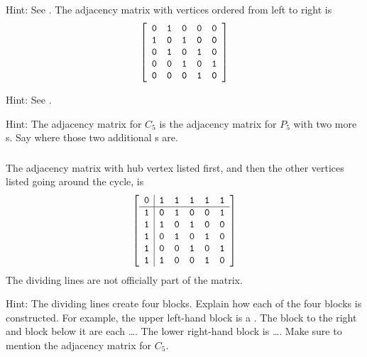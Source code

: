 \subsubsection*{ \answers}
\begin{apart}
    \item Hint: See .  The adjacency matrix with vertices ordered from left to right is
        $$\left[ 
            \begin{array}{ccccc}
                \texttt{0} & \texttt{1} & \texttt{0} & \texttt{0} & \texttt{0} \\
                \texttt{1} & \texttt{0} & \texttt{1} & \texttt{0} & \texttt{0} \\
                \texttt{0} & \texttt{1} & \texttt{0} & \texttt{1} & \texttt{0} \\
                \texttt{0} & \texttt{0} & \texttt{1} & \texttt{0} & \texttt{1} \\
                \texttt{0} & \texttt{0} & \texttt{0} & \texttt{1} & \texttt{0}               
            \end{array}
            \right]$$
    \item Hint: See .  
    \item Hint: The adjacency matrix for $C_5$ is the adjacency matrix for $P_5$ with two more s. Say where those two additional s are.
\end{apart}

\subsubsection*{ \answers}
\begin{apart}
    \item The adjacency matrix with hub vertex listed first, and then the other vertices listed going around the cycle, is
        $$\left[ 
            \begin{array}{c|ccccc}
                \texttt{0} &\texttt{1} & \texttt{1} & \texttt{1} & \texttt{1} & \texttt{1} \\ \hline
                \texttt{1} &\texttt{0} & \texttt{1} & \texttt{0} & \texttt{0} & \texttt{1} \\
                \texttt{1} &\texttt{1} & \texttt{0} & \texttt{1} & \texttt{0} & \texttt{0} \\
                \texttt{1} &\texttt{0} & \texttt{1} & \texttt{0} & \texttt{1} & \texttt{0} \\
                \texttt{1} &\texttt{0} & \texttt{0} & \texttt{1} & \texttt{0} & \texttt{1} \\
                \texttt{1} &\texttt{1} & \texttt{0} & \texttt{0} & \texttt{1} & \texttt{0}               
            \end{array}
            \right]$$    
    The dividing lines are not officially part of the matrix.
    \item Hint: The dividing lines create four blocks.  Explain how each of the four blocks is constructed.  For example, the upper left-hand block is a .  The block to the right and block below it are each \ldots. The lower right-hand block is \ldots.  Make sure to mention the adjacency matrix for $C_5$.
\end{apart}

